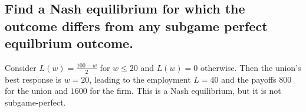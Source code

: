 \documentclass{article}
\begin{document}
\subsection{Find a Nash equilibrium for which the outcome differs from any subgame perfect
equilbrium outcome.}

Consider $L(w) = \tfrac{100-w}2$ for $w \leq 20$ and $L(w) = 0$ otherwise. Then the union's best response is $w=20$, leading to the employment $L=40$ and the payoffs $800$ for the union and $1600$ for the firm. This is a Nash equilibrium, but it is not subgame-perfect. 
%
\end{document}
